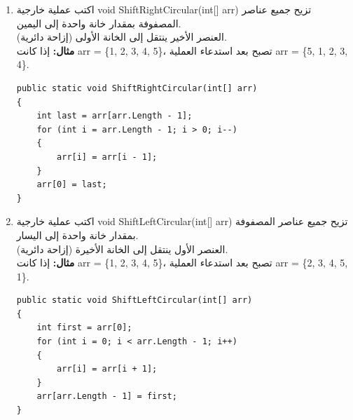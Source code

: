 \documentclass[14pt]{extarticle}
\begin{document}
\begin{enumerate}[resume, itemsep=2em]
    \item
    اكتب عملية خارجية \textenglish{void ShiftRightCircular(int[] arr)} تزيح جميع عناصر المصفوفة بمقدار خانة واحدة إلى اليمين.\\
    العنصر الأخير ينتقل إلى الخانة الأولى (إزاحة دائرية).\\
    \textbf{مثال:} إذا كانت \textenglish{arr = \{1, 2, 3, 4, 5\}}، تصبح بعد استدعاء العملية \textenglish{arr = \{5, 1, 2, 3, 4\}}.
    \ifwithsols
    \begin{boxSolution}
    \begin{english}
    \begin{verbatim}
public static void ShiftRightCircular(int[] arr)
{
    int last = arr[arr.Length - 1];
    for (int i = arr.Length - 1; i > 0; i--)
    {
        arr[i] = arr[i - 1];
    }
    arr[0] = last;
}
    \end{verbatim}
    \end{english}
    \end{boxSolution}
    \fi

    \item
    اكتب عملية خارجية \textenglish{void ShiftLeftCircular(int[] arr)} تزيح جميع عناصر المصفوفة بمقدار خانة واحدة إلى اليسار.\\
    العنصر الأول ينتقل إلى الخانة الأخيرة (إزاحة دائرية).\\
    \textbf{مثال:} إذا كانت \textenglish{arr = \{1, 2, 3, 4, 5\}}، تصبح بعد استدعاء العملية \textenglish{arr = \{2, 3, 4, 5, 1\}}.
    \ifwithsols
    \begin{boxSolution}
    \begin{english}
    \begin{verbatim}
public static void ShiftLeftCircular(int[] arr)
{
    int first = arr[0];
    for (int i = 0; i < arr.Length - 1; i++)
    {
        arr[i] = arr[i + 1];
    }
    arr[arr.Length - 1] = first;
}
    \end{verbatim}
    \end{english}
    \end{boxSolution}
    \fi


\end{enumerate}
\end{document}
